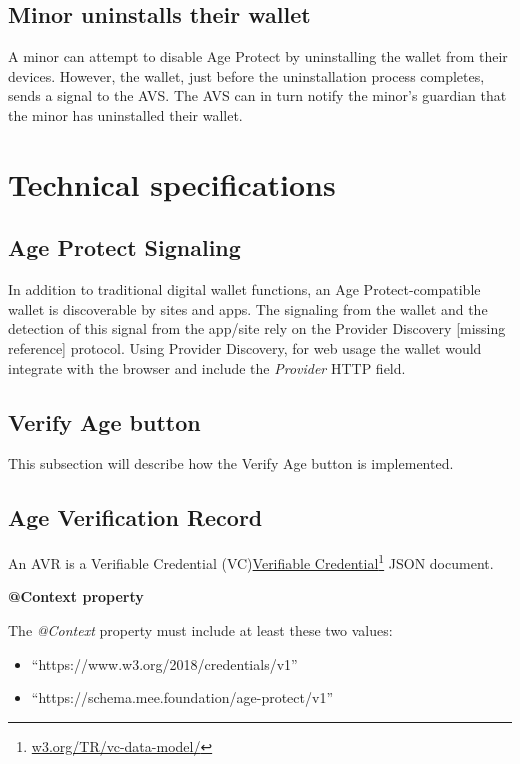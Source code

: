 \documentclass[11pt, oneside]{article}   	%
\newcommand{\hyperfootnote}[1][]{\def\ArgI{{#1}}\hyperfootnoteRelay}
\newcommand\hyperfootnoteRelay[2][]{\href{#1#2}{\ArgI}\footnote{\href{#1#2}{#2}}}
\begin{document}
\subsection{Minor uninstalls their wallet}

A minor can attempt to disable Age Protect by uninstalling the wallet from their devices. However, the wallet, just before the uninstallation process completes, sends a signal to the AVS. The AVS can in turn notify the minor's guardian that the minor has uninstalled their wallet.

\section{Technical specifications}

\subsection{Age Protect Signaling}
 
In addition to traditional digital wallet functions, an Age Protect-compatible wallet is discoverable by sites and apps. The signaling from the wallet and the detection of this signal from the app/site rely on the Provider Discovery \colorbox{BurntOrange}{[missing reference]} protocol. Using Provider Discovery, for web usage the wallet would integrate with the browser and include the \emph{Provider} HTTP field.

\subsection{Verify Age button}

This subsection will describe how the Verify Age button is implemented. 

\subsection{Age Verification Record}

An AVR is a Verifiable Credential (VC)\hyperfootnote[Verifiable Credential][https://]{w3.org/TR/vc-data-model/} JSON document. 

\textbf{@Context property}

The \emph{@Context} property must include at least these two values:
\begin{itemize}
	\item ``https://www.w3.org/2018/credentials/v1''
	\item ``https://schema.mee.foundation/age-protect/v1''
\end{itemize}
\end{document}

